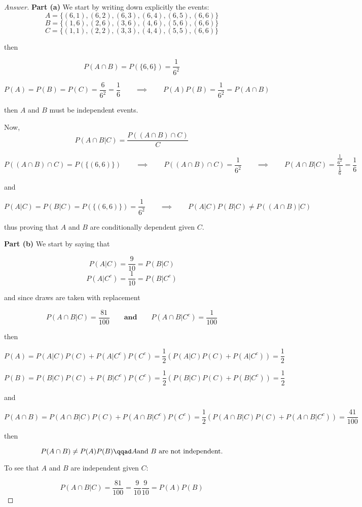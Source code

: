 \documentclass{article}
\theoremstyle{definition}
\newcommand{\qiq}{\qquad \implies \qquad}
\newcommand{\qaq}{\qquad \textbf{and} \qquad}
\begin{document}
\begin{proof}[Answer]
\textbf{Part (a)} We start by writing down explicitly the events:
$$A = \{(6, 1), (6, 2), (6, 3), (6, 4), (6, 5), (6, 6)\}$$
$$B = \{(1, 6), (2, 6), (3, 6), (4, 6), (5, 6), (6, 6)\}$$
$$C = \{(1, 1), (2, 2), (3, 3), (4, 4), (5, 5), (6, 6)\}$$

then

$$P(A\cap B) = P(\{6,6\}) = \frac{1}{6^2}$$

$$P(A) = P(B) = P(C) = \frac{6}{6^2}=\frac{1}{6} \qiq P(A)P(B) = \frac{1}{6^2} = P(A\cap B)$$

then $A$ and $B$ must be independent events.

Now,
$$P(A\cap B|C) = \frac{P((A\cap B)\cap C)}{C}$$

$$P((A\cap B)\cap C) = P(\{(6,6)\}) \qiq P((A\cap B)\cap C)=\frac{1}{6^2} \qiq P(A\cap B|C) = \frac{\frac{1}{6^2}}{\frac{1}{6}}=\frac{1}{6}$$

and 

$$P(A|C)= P(B|C) = P(\{(6,6)\})=\frac{1}{6^2} \qiq P(A|C)P(B|C)\neq P((A\cap B)|C)$$

thus proving that $A$  and $B$ are conditionally dependent given $C$.

\textbf{Part (b)}
We start by saying that 

$$P(A|C) = \frac{9}{10} = P(B|C)$$
$$P(A|C^c) = \frac{1}{10} = P(B|C^c)$$

and since draws are taken with replacement

$$P(A\cap B|C) = \frac{81}{100} \qaq P(A\cap B|C^c) = \frac{1}{100}$$

then

$$P(A) = P(A|C)P(C) + P(A|C^c)P(C^c)=\frac{1}{2}(P(A|C)P(C) + P(A|C^c))=\frac{1}{2}$$

$$P(B) = P(B|C)P(C) + P(B|C^c)P(C^c)=\frac{1}{2}(P(B|C)P(C) + P(B|C^c))=\frac{1}{2}$$

and

$$P(A\cap B) = P(A\cap B|C)P(C) + P(A\cap B|C^c)P(C^c)=\frac{1}{2}(P(A\cap B|C)P(C) + P(A\cap B|C^c))=\frac{41}{100}$$

then

$$P(A\cap B )\neq P(A)P(B) \qqad A\text{and }B\text{ are not independent.}$$

To see that $A$ and $B$ are independent given $C$:

$$P(A\cap B | C) = \frac{81}{100} = \frac{9}{10}\frac{9}{10} = P(A)P(B)$$



\end{proof}
\end{document}
